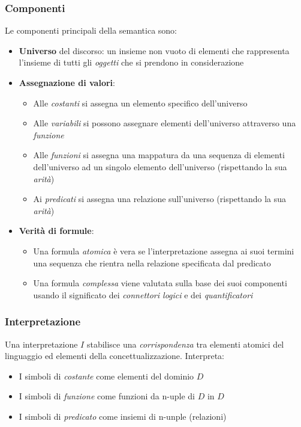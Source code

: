 \subsubsection{Componenti}
Le componenti principali della semantica sono:
\begin{itemize}
	\item \textbf{Universo} del discorso: un insieme non vuoto di elementi che rappresenta l'insieme di tutti gli \textit{oggetti} che si prendono in considerazione
	\item \textbf{Assegnazione di valori}:
	\begin{itemize}
		\item Alle \textit{costanti} si assegna un elemento specifico dell'universo
		\item Alle \textit{variabili} si possono assegnare elementi dell'universo attraverso una \textit{funzione}
		\item Alle \textit{funzioni} si assegna una mappatura da una sequenza di elementi dell'universo ad un singolo elemento dell'universo (rispettando la sua \textit{arità})
		\item Ai \textit{predicati} si assegna una relazione sull'universo (rispettando la sua \textit{arità})
	\end{itemize}
	\item \textbf{Verità di formule}:
	\begin{itemize}
		\item Una formula \textit{atomica} è vera se l'interpretazione assegna ai suoi termini una sequenza che rientra nella relazione specificata dal predicato
		\item Una formula \textit{complessa} viene valutata sulla  base dei suoi componenti usando il significato dei \textit{connettori logici} e dei \textit{quantificatori}
	\end{itemize}
\end{itemize}

\subsubsection{Interpretazione}
Una interpretazione $I$ stabilisce una \textit{corrispondenza} tra elementi atomici del linguaggio ed elementi della concettualizzazione. Interpreta:
\begin{itemize}
	\item I simboli di \textit{costante} come elementi del dominio $D$
	\item I simboli di \textit{funzione} come funzioni da n-uple di $D$ in $D$
	\item I simboli di \textit{predicato} come insiemi di n-unple (relazioni)
\end{itemize}

